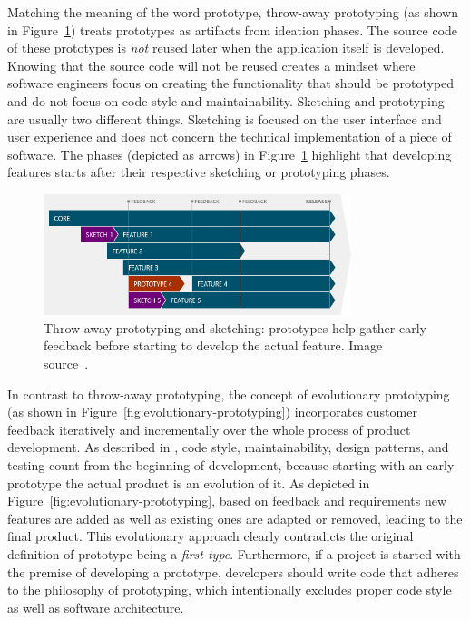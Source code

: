 Matching the meaning of the word prototype, throw-away prototyping (as shown in Figure~\ref{fig:throw-away-prototyping}) treats prototypes as artifacts from ideation phases.
The source code of these prototypes is \emph{not} reused later when the application itself is developed.
Knowing that the source code will not be reused creates a mindset where software engineers focus on creating the functionality that should be prototyped and do not focus on code style and maintainability.
Sketching and prototyping are usually two different things.
Sketching is focused on the user interface and user experience and does not concern the technical implementation of a piece of software.
The phases (depicted as arrows) in Figure~\ref{fig:throw-away-prototyping} highlight that developing features starts after their respective sketching or prototyping phases.
%
\begin{figure}
    \centering
    \includegraphics[width=0.8\textwidth]{images/throw-away-prototyping}
    \caption{Throw-away prototyping and sketching: prototypes help gather early feedback before starting to develop the actual feature. Image source~\cite{mourzenko_why_2014}.}
    \label{fig:throw-away-prototyping}
\end{figure}
%
In contrast to throw-away prototyping, the concept of evolutionary prototyping (as shown in Figure~\ref{fig:evolutionary-prototyping}) incorporates customer feedback iteratively and incrementally over the whole process of product development.
As described in \cite{mourzenko_why_2014}, code style, maintainability, design patterns, and testing count from the beginning of development, because starting with an early prototype the actual product is an evolution of it.
As depicted in Figure~\ref{fig:evolutionary-prototyping}, based on feedback and requirements new features are added as well as existing ones are adapted or removed, leading to the final product.
This evolutionary approach clearly contradicts the original definition of prototype being a \emph{first type}.
Furthermore, if a project is started with the premise of developing a prototype, developers should write code that adheres to the philosophy of prototyping, which intentionally excludes proper code style as well as software architecture.
